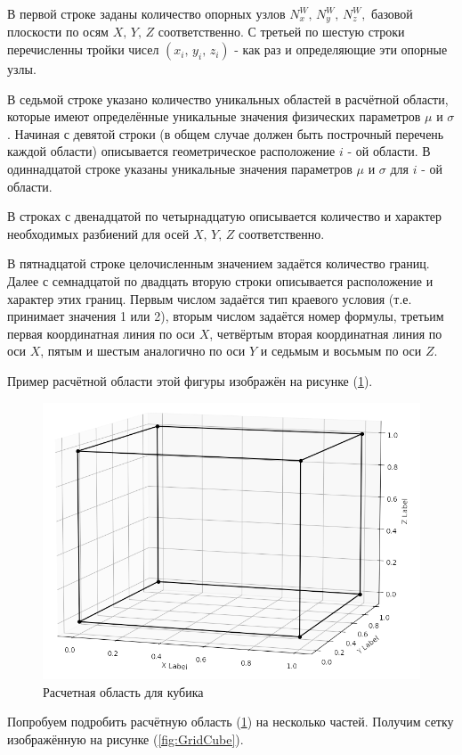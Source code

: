 В первой строке заданы количество опорных узлов $N_x^W, \,N_y^W, \,N_z^W,$ базовой плоскости по осям $X,\,Y,\,Z$ соответственно. С третьей по шестую строки перечисленны тройки чисел $\left(x_i, \, y_i, \, z_i\right)$ - как раз и определяющие эти опорные узлы. 

В седьмой строке указано количество уникальных областей в расчётной области, которые имеют определённые уникальные значения физических параметров $\mu$ и $\sigma$. Начиная с девятой строки (в общем случае должен быть построчный перечень каждой области) описывается геометрическое расположение $i$ - ой области.  В одиннадцатой строке указаны уникальные значения параметров $\mu$ и $\sigma$ для $i$ - ой области.

В строках с двенадцатой по четырнадцатую описывается количество и характер необходимых разбиений для осей $X,\,Y,\,Z$ соответственно.

В пятнадцатой строке целочисленным значением задаётся количество границ. Далее с семнадцатой по двадцать вторую строки описывается расположение и характер этих границ. Первым числом задаётся тип краевого условия (т.е. принимает значения 1 или 2), вторым числом задаётся номер формулы, третьим первая координатная линия по оси $X$, четвёртым вторая координатная линия по оси $X$, пятым и шестым аналогично по оси $Y$ и седьмым и восьмым по оси $Z$.

Пример расчётной области этой фигуры изображён на рисунке (\ref{fig:ExampleCube}).

\begin{figure}
	\centering
	\vspace*{0.7cm}
	\includegraphics[width=0.7\linewidth]{images/ExampleCube.png}
	\caption{Расчетная область для кубика}
	\label{fig:ExampleCube}
\end{figure}

Попробуем подробить расчётную область (\ref{fig:ExampleCube}) на несколько частей. Получим сетку изображённую на рисунке (\ref{fig:GridCube}).

